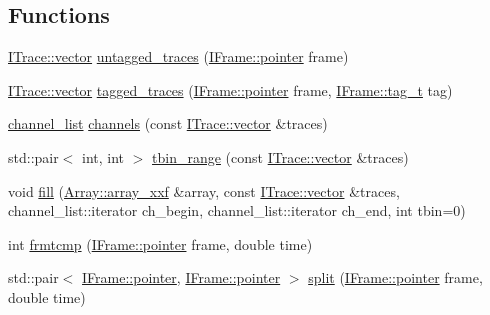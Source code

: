 \subsection*{Functions}
\begin{DoxyCompactItemize}
\item 
\hyperlink{class_wire_cell_1_1_i_data_ae1a9f863380499bb43f39fabb6276660}{I\+Trace\+::vector} \hyperlink{namespace_wire_cell_1_1_frame_tools_ab39e5b3fae9cf0abda7e6795007ad6df}{untagged\+\_\+traces} (\hyperlink{class_wire_cell_1_1_i_data_aff870b3ae8333cf9265941eef62498bc}{I\+Frame\+::pointer} frame)
\item 
\hyperlink{class_wire_cell_1_1_i_data_ae1a9f863380499bb43f39fabb6276660}{I\+Trace\+::vector} \hyperlink{namespace_wire_cell_1_1_frame_tools_ab75409594f96814edb45d39db9d705f6}{tagged\+\_\+traces} (\hyperlink{class_wire_cell_1_1_i_data_aff870b3ae8333cf9265941eef62498bc}{I\+Frame\+::pointer} frame, \hyperlink{class_wire_cell_1_1_i_frame_ae206ba618e10f398625dfeb675a4215a}{I\+Frame\+::tag\+\_\+t} tag)
\item 
\hyperlink{namespace_wire_cell_1_1_frame_tools_aaf07539dac296588f9004b525f940e67}{channel\+\_\+list} \hyperlink{namespace_wire_cell_1_1_frame_tools_aa68b64d0bc1fd1daa0646a35c26edcbb}{channels} (const \hyperlink{class_wire_cell_1_1_i_data_ae1a9f863380499bb43f39fabb6276660}{I\+Trace\+::vector} \&traces)
\item 
std\+::pair$<$ int, int $>$ \hyperlink{namespace_wire_cell_1_1_frame_tools_a9031f0d7465146236c47308c347d05a1}{tbin\+\_\+range} (const \hyperlink{class_wire_cell_1_1_i_data_ae1a9f863380499bb43f39fabb6276660}{I\+Trace\+::vector} \&traces)
\item 
void \hyperlink{namespace_wire_cell_1_1_frame_tools_a09db410acc8cf771ec60faec4eae7eef}{fill} (\hyperlink{namespace_wire_cell_1_1_array_ab565fef5e33632bb02f0ed4be803020c}{Array\+::array\+\_\+xxf} \&array, const \hyperlink{class_wire_cell_1_1_i_data_ae1a9f863380499bb43f39fabb6276660}{I\+Trace\+::vector} \&traces, channel\+\_\+list\+::iterator ch\+\_\+begin, channel\+\_\+list\+::iterator ch\+\_\+end, int tbin=0)
\item 
int \hyperlink{namespace_wire_cell_1_1_frame_tools_a21c3c601b6103fa7a63d9131b81dc229}{frmtcmp} (\hyperlink{class_wire_cell_1_1_i_data_aff870b3ae8333cf9265941eef62498bc}{I\+Frame\+::pointer} frame, double time)
\item 
std\+::pair$<$ \hyperlink{class_wire_cell_1_1_i_data_aff870b3ae8333cf9265941eef62498bc}{I\+Frame\+::pointer}, \hyperlink{class_wire_cell_1_1_i_data_aff870b3ae8333cf9265941eef62498bc}{I\+Frame\+::pointer} $>$ \hyperlink{namespace_wire_cell_1_1_frame_tools_a23aeb7045b99ef40f3c5ca79549e4f8f}{split} (\hyperlink{class_wire_cell_1_1_i_data_aff870b3ae8333cf9265941eef62498bc}{I\+Frame\+::pointer} frame, double time)
\end{DoxyCompactItemize}


